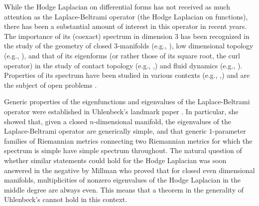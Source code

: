 While the Hodge Laplacian on differential forms has not received as much attention as the Laplace-Beltrami operator (the Hodge Laplacian on functions), there has been a substantial amount of interest in this operator in recent years. The importance of its (coexact) spectrum in dimension $3$ has been recognized in the study of the geometry of closed $3$-manifolds (e.g., \cite{Lipnowski2018}), low dimensional topology (e.g., \cite{Lin2021}), and that of its eigenforms (or rather those of its square root, the curl operator) in the study of contact topology (e.g., \cite{Etnyre2000III},\cite{Etnyre2012}) and fluid dynamics (e.g., \cite{CarMirPerPres2019}). Properties of its spectrum have been studied in various contexts (e.g., \cite{ColetteJunya2012},\cite{Junya2003}) and are the subject of open problems \cite[Problem $8.24$]{CaivoveanuRassias2001}. 
\par

Generic properties of the eigenfunctions and eigenvalues of the Laplace-Beltrami operator were established in Uhlenbeck's landmark paper \cite{Uhlenbeck1976}. In particular, she showed that, given a closed $n$-dimensional manifold, the eigenvalues of the Laplace-Beltrami operator are generically simple, and that generic $1$-parameter families of Riemannian metrics connecting two Riemannian metrics for which the spectrum is simple have simple spectrum throughout. The natural question of whether similar statements could hold for the Hodge Laplacian was soon answered in the negative by Millman \cite{Millman1980} who proved that for closed even dimensional manifolds, multiplicities of nonzero eigenvalues of the Hodge Laplacian in the middle degree are always even. This means that a theorem in the generality of Uhlenbeck's cannot hold in this context.\par

